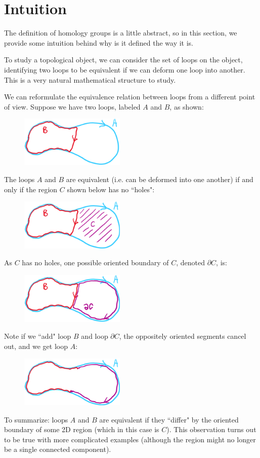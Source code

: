 \section{Intuition}
The definition of homology groups is a little abstract, so in this section, we provide some intuition behind why is it defined the way it is.

To study a topological object, we can consider the set of loops on the object, identifying two loops to be equivalent if we can deform one loop into another. This is a very natural mathematical structure to study.

We can reformulate the equivalence relation between loops from a different point of view. Suppose we have two loops, labeled $A$ and $B$, as shown:
\begin{figure}[H]
    \includegraphics[width=5cm]{figures/intuition-1}
    \centering
\end{figure}
The loops $A$ and $B$ are equivalent (i.e. can be deformed into one another) if and only if the region $C$ shown below has no ``holes":
\begin{figure}[H]
    \includegraphics[width=5cm]{figures/intuition-2}
    \centering
\end{figure}
As $C$ has no holes, one possible oriented boundary of $C$, denoted $\partial C$, is:
\begin{figure}[H]
    \includegraphics[width=5cm]{figures/intuition-3}
    \centering
\end{figure}
Note if we ``add" loop $B$ and loop $\partial C$, the oppositely oriented segments cancel out, and we get loop $A$:
\begin{figure}[H]
    \includegraphics[width=5cm]{figures/intuition-4}
    \centering
\end{figure}
To summarize: loops $A$ and $B$ are equivalent if they ``differ" by the oriented boundary of some 2D region (which in this case is $C$). This observation turns out to be true with more complicated examples (although the region might no longer be a single connected component).

